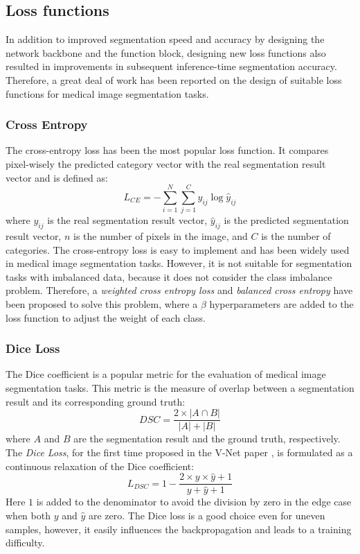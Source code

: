 \subsection{Loss functions}
In addition to improved segmentation speed and accuracy by designing the network
backbone and the function block, designing new loss functions also resulted in
improvements in subsequent inference-time segmentation accuracy. Therefore, a
great deal of work has been reported on the design of suitable loss functions
for medical image segmentation tasks.

\subsubsection{Cross Entropy}
The cross-entropy loss has been the most popular loss function. It compares
pixel-wisely the predicted category vector with the real segmentation result
vector and is defined as:
$$
L_{CE} = -\sum_{i=1}^{N} \sum_{j=1}^{C} y_{ij} \log \hat{y}_{ij}
$$
where $y_{ij}$ is the real segmentation result vector, $\hat{y}_{ij}$ is the
predicted segmentation result vector, $n$ is the number of pixels in the image,
and $C$ is the number of categories. The cross-entropy loss is easy to
implement and has been widely used in medical image segmentation tasks. However,
it is not suitable for segmentation tasks with imbalanced data, because it does
not consider the class imbalance problem. Therefore, a \emph{weighted cross
entropy loss} \cite{long2015fully} and \emph{balanced cross entropy} have been proposed to solve this
problem, where a $\beta$ hyperparameters are added to the loss function to adjust
the weight of each class.

\subsubsection{Dice Loss}
The Dice coefficient is a popular metric for the evaluation of medical image
segmentation tasks. This metric is the measure of overlap between a segmentation
result and its corresponding ground truth:
$$
DSC = \frac{2 \times |A \cap B|}{|A| + |B|}
$$
where $A$ and $B$ are the segmentation result and the ground truth,
respectively. The \emph{Dice Loss}, for the first time proposed in the V-Net
paper \cite{milletari2016vnet}, is formulated as a continuous relaxation of the
Dice coefficient:
$$
L_{DSC} = 1 - \frac{2 \times y \times \hat{y} + 1}{y + \hat{y} + 1}
$$
Here $1$ is added to the denominator to avoid the division by zero in the edge
case when both $y$ and $\hat{y}$ are zero. The Dice loss is a good choice even
for uneven samples, however, it easily influences the backpropagation and leads
to a training difficulty.

